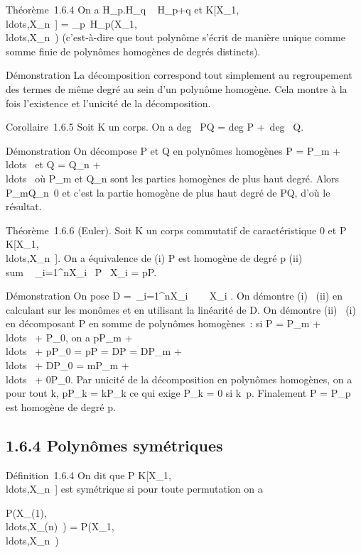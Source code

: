 Théorème~1.6.4 On a H_p.H_q \subset~ H_p+q et
K[X_1,\\ldots,X_n~]
=
\oplus_p\in{}~H_p(X_1,\\ldots,X_n~)
(c'est-à-dire que tout polynôme s'écrit de manière unique comme somme
finie de polynômes homogènes de degrés distincts).

Démonstration La décomposition correspond tout simplement au
regroupement des termes de même degré au sein d'un polynôme homogène.
Cela montre à la fois l'existence et l'unicité de la décomposition.

Corollaire~1.6.5 Soit K un corps. On a deg~ PQ
= deg P +\ deg~ Q.

Démonstration On décompose P et Q en polynômes homogènes P =
P_m +
\\ldots~ et Q =
Q_n +
\\ldots~ où
P_m et Q_n sont les parties homogènes de plus haut
degré. Alors P_mQ_n\neq~0 et
c'est la partie homogène de plus haut degré de PQ, d'où le résultat.

Théorème~1.6.6 (Euler). Soit K un corps commutatif de caractéristique 0
et P \in
K[X_1,\\ldots,X_n~].
On a équivalence de (i) P est homogène de degré p (ii)
\\sum ~
_i=1^nX_i \partial~P \over
\partial~X_i = pP.

Démonstration On pose D =\
\sum  _i=1^nX_i~ \partial~
\over \partial~X_i . On démontre (i) \rigtharrow~(ii) en
calculant sur les monômes et en utilisant la linéarité de D. On démontre
(ii) \rigtharrow~(i) en décomposant P en somme de polynômes homogènes~: si P =
P_m +
\\ldots~ +
P_0, on a pP_m +
\\ldots~ +
pP_0 = pP = DP = DP_m +
\\ldots~ +
DP_0 = mP_m +
\\ldots~ +
0P_0. Par unicité de la décomposition en polynômes homogènes,
on a pour tout k, pP_k = kP_k ce qui exige
P_k = 0 si k\neq~p. Finalement P =
P_p est homogène de degré p.

\subsection{1.6.4 Polynômes symétriques}

Définition~1.6.4 On dit que P \in
K[X_1,\\ldots,X_n~]
est symétrique si pour toute permutation \sigma on a

P(X_\sigma(1),\\ldots,X_\sigma(n)~)
=
P(X_1,\\ldots,X_n~)

